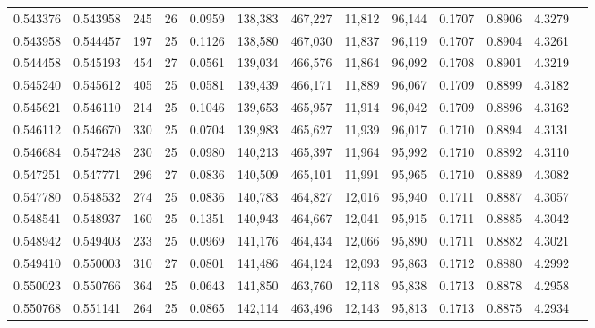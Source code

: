 \begin{tabular}{rrrrrrrrrrrrr}
0.543376 & 0.543958 &   245 &  26 &                                     0.0959 & 138,383 & 467,227 &  11,812 &  96,144 & 0.1707 & 0.8906 & 4.3279 \\
0.543958 & 0.544457 &   197 &  25 &                                     0.1126 & 138,580 & 467,030 &  11,837 &  96,119 & 0.1707 & 0.8904 & 4.3261 \\
0.544458 & 0.545193 &   454 &  27 &                                     0.0561 & 139,034 & 466,576 &  11,864 &  96,092 & 0.1708 & 0.8901 & 4.3219 \\
0.545240 & 0.545612 &   405 &  25 &                                     0.0581 & 139,439 & 466,171 &  11,889 &  96,067 & 0.1709 & 0.8899 & 4.3182 \\
0.545621 & 0.546110 &   214 &  25 &                                     0.1046 & 139,653 & 465,957 &  11,914 &  96,042 & 0.1709 & 0.8896 & 4.3162 \\
0.546112 & 0.546670 &   330 &  25 &                                     0.0704 & 139,983 & 465,627 &  11,939 &  96,017 & 0.1710 & 0.8894 & 4.3131 \\
0.546684 & 0.547248 &   230 &  25 &                                     0.0980 & 140,213 & 465,397 &  11,964 &  95,992 & 0.1710 & 0.8892 & 4.3110 \\
0.547251 & 0.547771 &   296 &  27 &                                     0.0836 & 140,509 & 465,101 &  11,991 &  95,965 & 0.1710 & 0.8889 & 4.3082 \\
0.547780 & 0.548532 &   274 &  25 &                                     0.0836 & 140,783 & 464,827 &  12,016 &  95,940 & 0.1711 & 0.8887 & 4.3057 \\
0.548541 & 0.548937 &   160 &  25 &                                     0.1351 & 140,943 & 464,667 &  12,041 &  95,915 & 0.1711 & 0.8885 & 4.3042 \\
0.548942 & 0.549403 &   233 &  25 &                                     0.0969 & 141,176 & 464,434 &  12,066 &  95,890 & 0.1711 & 0.8882 & 4.3021 \\
0.549410 & 0.550003 &   310 &  27 &                                     0.0801 & 141,486 & 464,124 &  12,093 &  95,863 & 0.1712 & 0.8880 & 4.2992 \\
0.550023 & 0.550766 &   364 &  25 &                                     0.0643 & 141,850 & 463,760 &  12,118 &  95,838 & 0.1713 & 0.8878 & 4.2958 \\
0.550768 & 0.551141 &   264 &  25 &                                     0.0865 & 142,114 & 463,496 &  12,143 &  95,813 & 0.1713 & 0.8875 & 4.2934 \\

\end{tabular}

